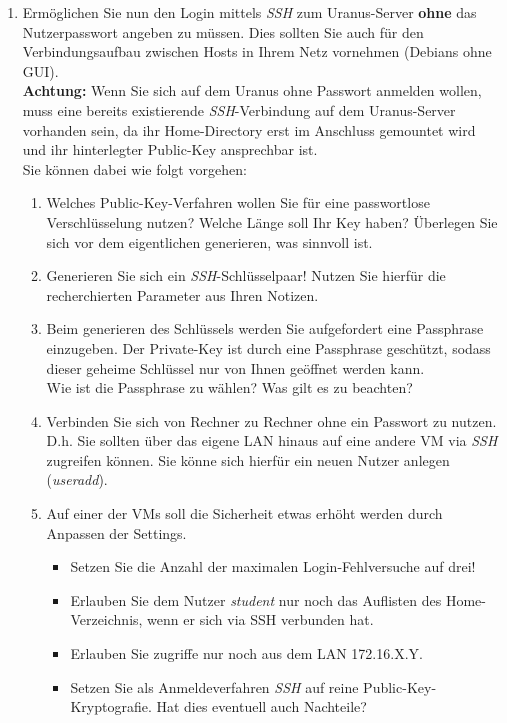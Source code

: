 \documentclass[paper=a4,fontsize=11pt]{scrartcl}%
\numberwithin{equation}{section}
\begin{document}
\begin{enumerate}
\begin{enumerate}
\end{enumerate}
	\item Ermöglichen Sie nun den Login mittels \emph{SSH} zum Uranus-Server \textbf{ohne} das Nutzerpasswort angeben zu müssen. Dies sollten Sie auch für den Verbindungsaufbau zwischen Hosts in Ihrem Netz vornehmen (Debians ohne GUI).\\
	\textbf{Achtung:} Wenn Sie sich auf dem Uranus ohne Passwort anmelden wollen, muss eine bereits existierende \emph{SSH}-Verbindung auf dem Uranus-Server vorhanden sein, da ihr Home-Directory erst im Anschluss gemountet wird und ihr hinterlegter Public-Key ansprechbar ist.\\
	Sie können dabei wie folgt vorgehen:
\begin{enumerate}
	\item Welches Public-Key-Verfahren wollen Sie für eine passwortlose Verschlüsselung nutzen? Welche Länge soll Ihr Key haben? Überlegen Sie sich vor dem eigentlichen generieren, was sinnvoll ist.
	\item Generieren Sie sich ein \emph{SSH}-Schlüsselpaar! Nutzen Sie hierfür die recherchierten Parameter aus Ihren Notizen.
	\item Beim generieren des Schlüssels werden Sie aufgefordert eine Passphrase einzugeben. Der Private-Key ist durch eine Passphrase geschützt, sodass dieser geheime Schlüssel nur von Ihnen geöffnet werden kann.\\
	Wie ist die Passphrase zu wählen? Was gilt es zu beachten?
	\item Verbinden Sie sich von Rechner zu Rechner ohne ein Passwort zu nutzen. D.h. Sie sollten über das eigene LAN hinaus auf eine andere VM via \emph{SSH} zugreifen können. Sie könne sich hierfür ein neuen Nutzer anlegen (\emph{useradd}).
	\item Auf einer der VMs soll die Sicherheit etwas erhöht werden durch Anpassen der Settings.
	\begin{itemize}
		\item Setzen Sie die Anzahl der maximalen Login-Fehlversuche auf drei! 
		\item Erlauben Sie dem Nutzer \emph{student} nur noch das Auflisten des Home-Verzeichnis, wenn er sich via SSH verbunden hat.
		\item Erlauben Sie zugriffe nur noch aus dem LAN 172.16.X.Y.
		\item Setzen Sie als Anmeldeverfahren \emph{SSH} auf reine Public-Key-Kryptografie. Hat dies eventuell auch Nachteile?
	\end{itemize}
\end{enumerate}


\end{enumerate}
\end{document}
